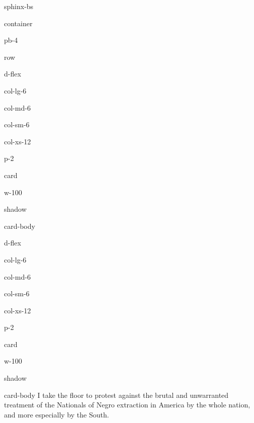 \documentclass[letterpaper,10pt,english]{jupyterBook}
\begin{document}
\begin{sphinxuseclass}{sphinx-bs}
\begin{sphinxuseclass}{container}
\begin{sphinxuseclass}{pb-4}
\begin{sphinxuseclass}{row}
\begin{sphinxuseclass}{d-flex}
\begin{sphinxuseclass}{col-lg-6}
\begin{sphinxuseclass}{col-md-6}
\begin{sphinxuseclass}{col-sm-6}
\begin{sphinxuseclass}{col-xs-12}
\begin{sphinxuseclass}{p-2}
\begin{sphinxuseclass}{card}
\begin{sphinxuseclass}{w-100}
\begin{sphinxuseclass}{shadow}
\begin{sphinxuseclass}{card-body}
\end{sphinxuseclass}
\end{sphinxuseclass}
\end{sphinxuseclass}
\end{sphinxuseclass}
\end{sphinxuseclass}
\end{sphinxuseclass}
\end{sphinxuseclass}
\end{sphinxuseclass}
\end{sphinxuseclass}
\end{sphinxuseclass}
\begin{sphinxuseclass}{d-flex}
\begin{sphinxuseclass}{col-lg-6}
\begin{sphinxuseclass}{col-md-6}
\begin{sphinxuseclass}{col-sm-6}
\begin{sphinxuseclass}{col-xs-12}
\begin{sphinxuseclass}{p-2}
\begin{sphinxuseclass}{card}
\begin{sphinxuseclass}{w-100}
\begin{sphinxuseclass}{shadow}
\begin{sphinxuseclass}{card-body}
\sphinxAtStartPar
I take the floor to protest against the brutal and unwarranted treatment of the Nationals of Negro extraction in America by the whole nation, and more especially by the South.

\end{sphinxuseclass}
\end{sphinxuseclass}
\end{sphinxuseclass}
\end{sphinxuseclass}
\end{sphinxuseclass}
\end{sphinxuseclass}
\end{sphinxuseclass}
\end{sphinxuseclass}
\end{sphinxuseclass}
\end{sphinxuseclass}
\end{sphinxuseclass}
\end{sphinxuseclass}
\end{sphinxuseclass}
\end{sphinxuseclass}
\end{document}
